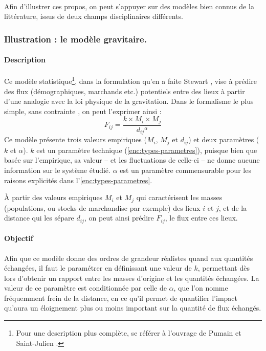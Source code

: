 \documentclass[12pt, a4paper, oneside]{book}
\begin{document}
	\paragraph{}Afin d'illustrer ces propos, on peut s'appuyer sur des modèles bien connus de la littérature, issus de deux champs disciplinaires différents.
	
	\subsubsection{Illustration : le modèle gravitaire.\label{desc:gravitaire}}
	
	\paragraph{Description}	Ce modèle statistique\footnote{Pour une description plus complète, se référer à l'ouvrage de Pumain et Saint-Julien \autocite{pumain_les_2001}.}, dans la formulation qu'en a faite Stewart \autocite{stewart_demographic_1948}, vise à prédire des flux (démographiques, marchands etc.) potentiels entre des lieux à partir d'une analogie avec la loi physique de la gravitation. Dans le formalisme le plus simple, \og sans contrainte\fg{} \autocite{pumain_les_2001}, on peut l'exprimer ainsi :
	$$
	F_{ij} = \frac{k \times M_{i} \times M_{j}}{d_{ij}{}^\alpha}
	$$
	Ce modèle présente trois valeurs empiriques ($M_i$, $M_j$ et $d_{ij}$) et deux paramètres ($k$ et $\alpha$). $k$ est un paramètre technique (\cref{enc:types-parametres}), puisque bien que basée sur l'empirique, sa valeur -- et les fluctuations de celle-ci -- ne donne aucune information sur le système étudié. $\alpha$ est un paramètre commensurable pour les raisons explicités dans l'\cref{enc:types-parametres}.
	
	À partir des valeurs empiriques $M_i$ et $M_j$ qui caractérisent les masses (populations, ou stocks de  marchandise par exemple) des lieux $i$ et $j$, et de la distance qui les sépare $d_{ij}$, on peut ainsi prédire $F_{ij}$, le flux entre ces lieux.
	
	\paragraph{Objectif} Afin que ce modèle donne des ordres de grandeur réalistes quand aux quantités échangées, il faut le paramétrer en définissant une valeur de $k$, permettant dès lors d'obtenir un rapport entre les masses d'origine et les quantités échangées.
	La valeur de ce paramètre est conditionnée par celle de $\alpha$, que l'on nomme fréquemment \og frein de la distance\fg{}, en ce qu'il permet de quantifier l'impact qu'aura un éloignement plus ou moins important sur la quantité de flux échangés.
	
\end{document}
